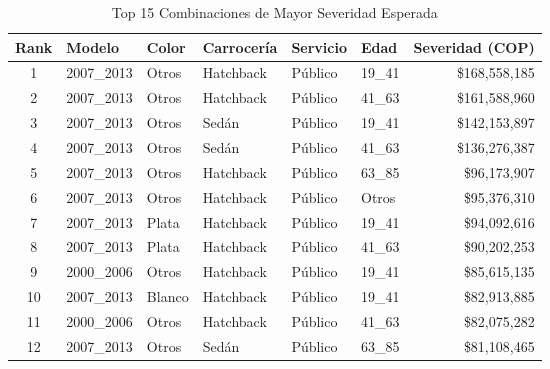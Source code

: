 \begin{table}[H]
\centering
\caption{Top 15 Combinaciones de Mayor Severidad Esperada}
\begin{tabular}{|c|l|l|l|l|l|r|}
\hline
\textbf{Rank} & \textbf{Modelo} & \textbf{Color} & \textbf{Carrocería} & \textbf{Servicio} & \textbf{Edad} & \textbf{Severidad (COP)} \\
\hline
1 & 2007\_2013 & Otros & Hatchback & Público & 19\_41 & \$168,558,185 \\
2 & 2007\_2013 & Otros & Hatchback & Público & 41\_63 & \$161,588,960 \\
3 & 2007\_2013 & Otros & Sedán & Público & 19\_41 & \$142,153,897 \\
4 & 2007\_2013 & Otros & Sedán & Público & 41\_63 & \$136,276,387 \\
5 & 2007\_2013 & Otros & Hatchback & Público & 63\_85 & \$96,173,907 \\
6 & 2007\_2013 & Otros & Hatchback & Público & Otros & \$95,376,310 \\
7 & 2007\_2013 & Plata & Hatchback & Público & 19\_41 & \$94,092,616 \\
8 & 2007\_2013 & Plata & Hatchback & Público & 41\_63 & \$90,202,253 \\
9 & 2000\_2006 & Otros & Hatchback & Público & 19\_41 & \$85,615,135 \\
10 & 2007\_2013 & Blanco & Hatchback & Público & 19\_41 & \$82,913,885 \\
11 & 2000\_2006 & Otros & Hatchback & Público & 41\_63 & \$82,075,282 \\
12 & 2007\_2013 & Otros & Sedán & Público & 63\_85 & \$81,108,465 \\
\hline
\end{tabular}
\end{table}